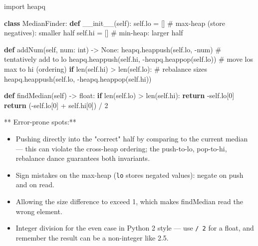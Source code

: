 \documentclass[11pt]{article}
\providecommand{\tightlist}{\setlength{\itemsep}{1pt}\setlength{\parskip}{0pt}}
\newenvironment{Shaded}{\begin{snugshade}}{\end{snugshade}}
\newcommand{\BuiltInTok}[1]{\textcolor[rgb]{0.50,0.55,0.55}{#1}}
\newcommand{\CommentTok}[1]{\textcolor[rgb]{0.48,0.49,0.49}{#1}}
\newcommand{\ControlFlowTok}[1]{\textcolor[rgb]{0.99,0.74,0.29}{\textbf{#1}}}
\newcommand{\DecValTok}[1]{\textcolor[rgb]{0.96,0.45,0.00}{#1}}
\newcommand{\FunctionTok}[1]{\textcolor[rgb]{0.56,0.27,0.68}{#1}}
\newcommand{\ImportTok}[1]{\textcolor[rgb]{0.15,0.68,0.38}{#1}}
\newcommand{\KeywordTok}[1]{\textcolor[rgb]{0.81,0.81,0.76}{\textbf{#1}}}
\newcommand{\NormalTok}[1]{\textcolor[rgb]{0.81,0.81,0.76}{#1}}
\newcommand{\OperatorTok}[1]{\textcolor[rgb]{0.81,0.81,0.76}{#1}}
\newcommand{\VariableTok}[1]{\textcolor[rgb]{0.15,0.68,0.68}{#1}}
\begin{document}
\begin{Shaded}
\begin{Highlighting}[]
\ImportTok{import}\NormalTok{ heapq}

\KeywordTok{class}\NormalTok{ MedianFinder:}
    \KeywordTok{def} \FunctionTok{\_\_init\_\_}\NormalTok{(}\VariableTok{self}\NormalTok{):}
        \VariableTok{self}\NormalTok{.lo }\OperatorTok{=}\NormalTok{ []   }\CommentTok{\# max{-}heap (store negatives): smaller half}
        \VariableTok{self}\NormalTok{.hi }\OperatorTok{=}\NormalTok{ []   }\CommentTok{\# min{-}heap: larger half}

    \KeywordTok{def}\NormalTok{ addNum(}\VariableTok{self}\NormalTok{, num: }\BuiltInTok{int}\NormalTok{) }\OperatorTok{{-}\textgreater{}} \VariableTok{None}\NormalTok{:}
\NormalTok{        heapq.heappush(}\VariableTok{self}\NormalTok{.lo, }\OperatorTok{{-}}\NormalTok{num)                 }\CommentTok{\# tentatively add to lo}
\NormalTok{        heapq.heappush(}\VariableTok{self}\NormalTok{.hi, }\OperatorTok{{-}}\NormalTok{heapq.heappop(}\VariableTok{self}\NormalTok{.lo))  }\CommentTok{\# move lo\textquotesingle{}s max to hi (ordering)}
        \ControlFlowTok{if} \BuiltInTok{len}\NormalTok{(}\VariableTok{self}\NormalTok{.hi) }\OperatorTok{\textgreater{}} \BuiltInTok{len}\NormalTok{(}\VariableTok{self}\NormalTok{.lo):               }\CommentTok{\# rebalance sizes}
\NormalTok{            heapq.heappush(}\VariableTok{self}\NormalTok{.lo, }\OperatorTok{{-}}\NormalTok{heapq.heappop(}\VariableTok{self}\NormalTok{.hi))}

    \KeywordTok{def}\NormalTok{ findMedian(}\VariableTok{self}\NormalTok{) }\OperatorTok{{-}\textgreater{}} \BuiltInTok{float}\NormalTok{:}
        \ControlFlowTok{if} \BuiltInTok{len}\NormalTok{(}\VariableTok{self}\NormalTok{.lo) }\OperatorTok{\textgreater{}} \BuiltInTok{len}\NormalTok{(}\VariableTok{self}\NormalTok{.hi):}
            \ControlFlowTok{return} \OperatorTok{{-}}\VariableTok{self}\NormalTok{.lo[}\DecValTok{0}\NormalTok{]}
        \ControlFlowTok{return}\NormalTok{ (}\OperatorTok{{-}}\VariableTok{self}\NormalTok{.lo[}\DecValTok{0}\NormalTok{] }\OperatorTok{+} \VariableTok{self}\NormalTok{.hi[}\DecValTok{0}\NormalTok{]) }\OperatorTok{/} \DecValTok{2}
\end{Highlighting}
\end{Shaded}

** Error-prone spots:**

\begin{itemize}
\tightlist
\item
  Pushing directly into the "correct" half by comparing to the current median --- this can violate the cross-heap ordering; the push-to-lo, pop-to-hi, rebalance dance guarantees both invariants.
\item
  Sign mistakes on the max-heap (\texttt{lo} stores negated values): negate on push and on read.
\item
  Allowing the size difference to exceed 1, which makes findMedian read the wrong element.
\item
  Integer division for the even case in Python 2 style --- use \texttt{/\ 2} for a float, and remember the result can be a non-integer like 2.5.
\end{itemize}
\end{document}
